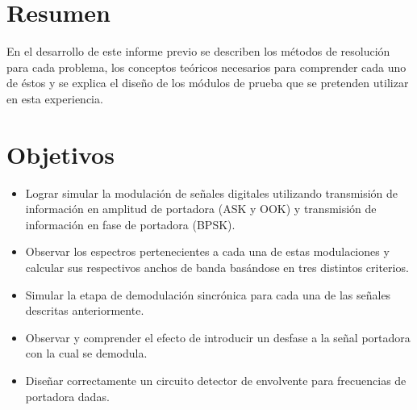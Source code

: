 \documentclass[letterpaper, titlepage]{article}
\begin{document}
\maketitle
\newpage
\section{Resumen}
	En el desarrollo de este informe previo se describen los métodos de resolución para cada problema, los conceptos teóricos necesarios para comprender cada uno de éstos y se explica el diseño de los módulos de prueba que se pretenden utilizar en esta experiencia.
\section{Objetivos}
	\begin{itemize}
		\item Lograr simular la modulación de señales digitales utilizando transmisión de información en amplitud de portadora (ASK y OOK) y transmisión de información en fase de portadora (BPSK).
		\item Observar los espectros pertenecientes a cada una de estas modulaciones y calcular sus respectivos anchos de banda basándose en tres distintos criterios.
		\item Simular la etapa de demodulación sincrónica para cada una de las señales descritas anteriormente.
		\item Observar y comprender el efecto de introducir un desfase a la señal portadora con la cual se demodula.
		\item Diseñar correctamente un circuito detector de envolvente para frecuencias de portadora dadas.
	\end{itemize}
\newpage
\end{document}
